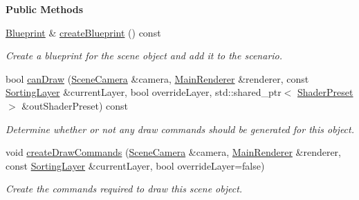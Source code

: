 \begin{Indent}\textbf{ Public Methods}\par
\begin{DoxyCompactItemize}
\item 
\mbox{\label{classrev_1_1_scene_object_ac6a3d8a066127dc14580580566903066}} 
\mbox{\hyperlink{classrev_1_1_blueprint}{Blueprint}} \& \mbox{\hyperlink{classrev_1_1_scene_object_ac6a3d8a066127dc14580580566903066}{create\+Blueprint}} () const
\begin{DoxyCompactList}\small\item\em Create a blueprint for the scene object and add it to the scenario. \end{DoxyCompactList}\item 
\mbox{\label{classrev_1_1_scene_object_afd268e788dfbb6cd3537d6927d9b1d45}} 
bool \mbox{\hyperlink{classrev_1_1_scene_object_afd268e788dfbb6cd3537d6927d9b1d45}{can\+Draw}} (\mbox{\hyperlink{classrev_1_1_scene_camera}{Scene\+Camera}} \&camera, \mbox{\hyperlink{classrev_1_1_main_renderer}{Main\+Renderer}} \&renderer, const \mbox{\hyperlink{structrev_1_1_sorting_layer}{Sorting\+Layer}} \&current\+Layer, bool override\+Layer, std\+::shared\+\_\+ptr$<$ \mbox{\hyperlink{classrev_1_1_shader_preset}{Shader\+Preset}} $>$ \&out\+Shader\+Preset) const
\begin{DoxyCompactList}\small\item\em Determine whether or not any draw commands should be generated for this object. \end{DoxyCompactList}\item 
\mbox{\label{classrev_1_1_scene_object_a93e94df284ae067ca1f968d8e34d6166}} 
void \mbox{\hyperlink{classrev_1_1_scene_object_a93e94df284ae067ca1f968d8e34d6166}{create\+Draw\+Commands}} (\mbox{\hyperlink{classrev_1_1_scene_camera}{Scene\+Camera}} \&camera, \mbox{\hyperlink{classrev_1_1_main_renderer}{Main\+Renderer}} \&renderer, const \mbox{\hyperlink{structrev_1_1_sorting_layer}{Sorting\+Layer}} \&current\+Layer, bool override\+Layer=false)
\begin{DoxyCompactList}\small\item\em Create the commands required to draw this scene object. \end{DoxyCompactList}\item 
\mbox{\label{classrev_1_1_scene_object_a2c9faa6b2b128f004bdc4e5c2e4df16d}} 

\end{DoxyCompactItemize}
\end{Indent}
